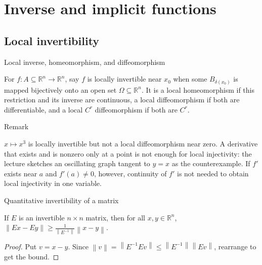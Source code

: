 \chapter{Inverse and implicit functions}

\section{Local invertibility}

\begin{definition}{Local inverse, homeomorphism, and diffeomorphism}

For \(f:A \subseteq \mathbb{R}^{n}\rightarrow\mathbb{R}^{n}\), say \(f\) is locally invertible near \(x_{0}\) when some \(B_{\delta{(x_{0})}}\) is mapped bijectively onto an open set \(\Omega \subseteq \mathbb{R}^{n}\). It is a local homeomorphism if this restriction and its inverse are continuous, a local diffeomorphism if both are differentiable, and a local \(C^{r}\) diffeomorphism if both are \(C^{r}\).

\end{definition}

\begin{qlremark}{Remark}

\(x\mapsto x^{3}\) is locally invertible but not a local diffeomorphism near zero. A derivative that exists and is nonzero only at a point is not enough for local injectivity: the lecture sketches an oscillating graph tangent to \(y = x\) as the counterexample. If \(f'\) exists near \(a\) and \(f'(a) \neq 0\), however, continuity of \(f'\) is not needed to obtain local injectivity in one variable.

\end{qlremark}

\begin{lemma}{Quantitative invertibility of a matrix}

If \(E\) is an invertible \(n \times n\) matrix, then for all \(x,y \in \mathbb{R}^{n}\), \(\left\| {Ex - Ey} \right\| \geq \frac{1}{\left\| E^{- 1} \right\|}\left\| {x - y} \right\|\).

\end{lemma}

\begin{proof}

Put \(v = x - y\). Since \(\left\| v \right\| = \left\| {E^{- 1}Ev} \right\| \leq \left\| E^{- 1} \right\|\left\| {Ev} \right\|\), rearrange to get the bound.

\end{proof}

